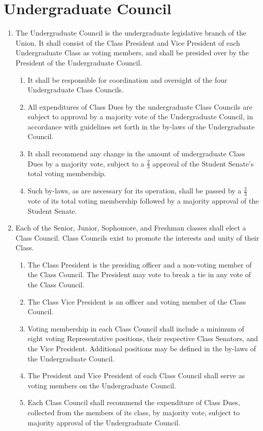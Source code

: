 \documentclass[12pt]{constitution}
\begin{document}
\section{Undergraduate Council}
\begin{enumerate}
\item The Undergraduate Council is the undergraduate legislative branch of the Union. It shall consist of the Class President and Vice President of each Undergraduate Class as voting members, and shall be presided over by the President of the Undergraduate Council.
\begin{enumerate}
\item It shall be responsible for coordination and oversight of the four Undergraduate Class Councils.
\item All expenditures of Class Dues by the undergraduate Class Councils are subject to approval by a majority vote of the Undergraduate Council, in accordance with guidelines set forth in the by-laws of the Undergraduate Council.
\item It shall recommend any change in the amount of undergraduate Class Dues by a majority vote, subject to a $\frac{2}{3}$ approval of the Student Senate’s total voting membership.
\item Such by-laws, as are necessary for its operation, shall be passed by a $\frac{2}{3}$ vote of its total voting membership followed by a majority approval of the Student Senate.
\end{enumerate}
\item Each of the Senior, Junior, Sophomore, and Freshman classes shall elect a Class Council. Class Councils exist to promote the interests and unity of their Class.
\begin{enumerate}
\item The Class President is the presiding officer and a non-voting member of the Class
Council. The President may vote to break a tie in any vote of the Class Council.
\item The Class Vice President is an officer and voting member of the Class Council.
\item Voting membership in each Class Council shall include a minimum of eight voting Representative positions, their respective Class Senators, and the Vice President. Additional positions may be defined in the by-laws of the Undergraduate Council.
\item The President and Vice President of each Class Council shall serve as voting members on the Undergraduate Council.
\item Each Class Council shall recommend the expenditure of Class Dues, collected from the members of its class, by majority vote, subject to majority approval of the Undergraduate Council.

\end{enumerate}
\end{enumerate}
\end{document}
